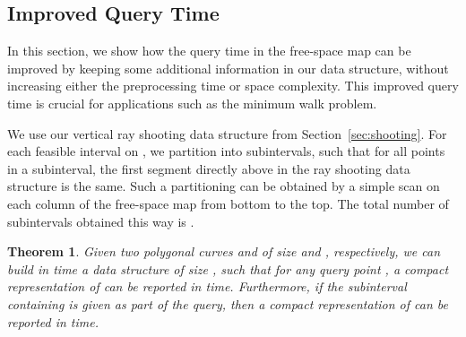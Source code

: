 \documentclass[12pt]{dalthesis}
\newtheorem{theorem}{Theorem}
\newcommand{\fs}{free-space }
\begin{document}
\subsection{Improved Query Time} \label{sec:improved}

In this section, we show how the query time
in the \fs map can be improved
by keeping some additional information in our data structure,
without increasing either the preprocessing time or space complexity.
This improved query time is crucial for 
applications such as the minimum walk problem.

We use our vertical ray shooting data structure from Section~\ref{sec:shooting}.
For each feasible interval  on , 
we partition  into  subintervals, such that
for all points  in a subinterval, 
the first segment directly above  in the ray shooting data structure is the same.
Such a partitioning can be obtained by a simple scan on each column of
the \fs map from bottom to the top.
The total number of subintervals obtained this way is .
	
\begin{theorem} \label{thm:mainFreeSpaceMap}
	Given two polygonal curves  and  of size  and , respectively,
	we can build in  time a data structure of size , such that
	for any query point , 
	a compact representation of 
	can be reported in  time.
	Furthermore, if the subinterval containing  is given as part of the query,
	then a compact representation of  can be reported in  time.
\end{theorem}
\end{document}
